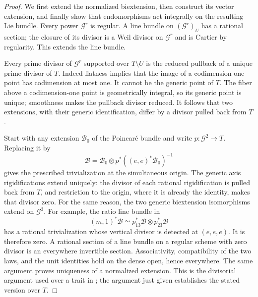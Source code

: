 \begin{proof}
We first extend the normalized biextension, then construct its vector
extension, and finally show that endomorphisms act integrally on the
resulting Lie bundle. Every power $\mathcal G^r$ is
regular. A line bundle on $(\mathcal G^r)_U$ has a rational section;
the closure of its divisor is a Weil divisor on $\mathcal G^r$ and is
Cartier by regularity. This extends the line bundle.

Every prime divisor of $\mathcal G^r$ supported over $T\setminus U$
is the reduced pullback of a unique prime divisor of $T$. Indeed
flatness implies that the image of a codimension-one point has
codimension at most one. It cannot be the generic point of $T$.
The fiber above a codimension-one point is geometrically integral,
so its generic point is unique; smoothness makes the pullback divisor
reduced. It follows that two extensions, with their generic
identification, differ by a divisor pulled back from $T$.

Start with any extension $\mathscr B_0$ of the Poincar\'e bundle and
write $p:\mathcal G^2\to T$. Replacing it by
\[
 \mathscr B=\mathscr B_0\otimes
         p^*((e,e)^*\mathscr B_0)^{-1}
\]
gives the prescribed trivialization at the simultaneous origin.
The generic axis rigidifications extend uniquely: the divisor of each
rational rigidification is pulled back from $T$, and restriction to
the origin, where it is already the identity, makes that divisor zero.
For the same reason, the two generic biextension isomorphisms extend
on $\mathcal G^3$. For example, the ratio line bundle in
\[
 (m,1)^*\mathscr B\simeq
          p_{13}^*\mathscr B\otimes p_{23}^*\mathscr B
\]
has a rational trivialization whose vertical divisor is detected at
$(e,e,e)$. It is therefore zero. A rational section of a line bundle
on a regular scheme with zero divisor is an everywhere invertible
section. Associativity, compatibility of the two laws, and the unit
identities hold on the dense open, hence everywhere. The same argument
proves uniqueness of a normalized extension. This is the divisorial
argument used over a trait in
\cite[Proposition~6.7.1]{EdixhovenLido2023}; the argument just given
establishes the stated version over $T$.


\end{proof}
